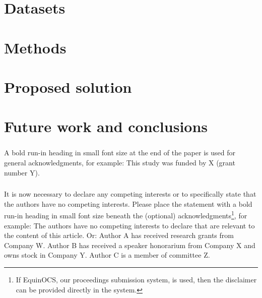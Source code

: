 \documentclass[runningheads]{llncs}
\begin{document}



\section{Datasets}


\section{Methods}


\section{Proposed solution}


\section{Future work and conclusions}


\begin{credits}
\subsubsection{\ackname} A bold run-in heading in small font size at the end of the paper is
used for general acknowledgments, for example: This study was funded
by X (grant number Y).

\subsubsection{\discintname}
It is now necessary to declare any competing interests or to specifically
state that the authors have no competing interests. Please place the
statement with a bold run-in heading in small font size beneath the
(optional) acknowledgments\footnote{If EquinOCS, our proceedings submission
system, is used, then the disclaimer can be provided directly in the system.},
for example: The authors have no competing interests to declare that are
relevant to the content of this article. Or: Author A has received research
grants from Company W. Author B has received a speaker honorarium from
Company X and owns stock in Company Y. Author C is a member of committee Z.
\end{credits}
%
%
%


%
\end{document}
